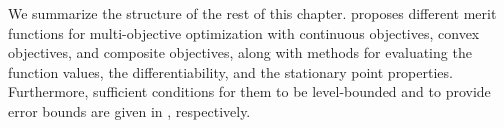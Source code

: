 \documentclass[../main]{subfiles}
\begin{document}
We summarize the structure of the rest of this chapter.
 proposes different merit functions for multi-objective optimization with continuous objectives, convex objectives, and composite objectives, along with methods for evaluating the function values, the differentiability, and the stationary point properties.
Furthermore, sufficient conditions for them to be level-bounded and to provide error bounds are given in , respectively.
\end{document}
